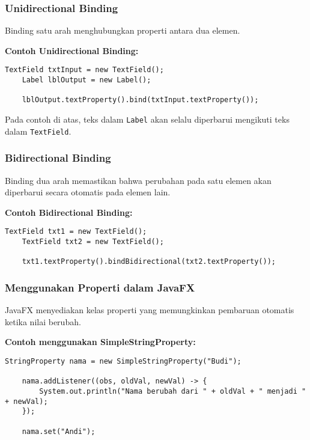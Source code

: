 \subsubsection{Unidirectional Binding}

Binding satu arah menghubungkan properti antara dua elemen.

\textbf{Contoh Unidirectional Binding:}
\begin{lstlisting}[style=JavaStyle, caption=Menghubungkan Label dengan TextField]
	TextField txtInput = new TextField();
	Label lblOutput = new Label();
	
	lblOutput.textProperty().bind(txtInput.textProperty());
\end{lstlisting}

Pada contoh di atas, teks dalam \texttt{Label} akan selalu diperbarui mengikuti teks dalam \texttt{TextField}.

\subsubsection{Bidirectional Binding}

Binding dua arah memastikan bahwa perubahan pada satu elemen akan diperbarui secara otomatis pada elemen lain.

\textbf{Contoh Bidirectional Binding:}
\begin{lstlisting}[style=JavaStyle, caption=Menghubungkan dua TextField secara bidirectional]
	TextField txt1 = new TextField();
	TextField txt2 = new TextField();
	
	txt1.textProperty().bindBidirectional(txt2.textProperty());
\end{lstlisting}

\subsubsection{Menggunakan Properti dalam JavaFX}

JavaFX menyediakan kelas properti yang memungkinkan pembaruan otomatis ketika nilai berubah.

\textbf{Contoh menggunakan SimpleStringProperty:}
\begin{lstlisting}[style=JavaStyle, caption=Penggunaan SimpleStringProperty]
	StringProperty nama = new SimpleStringProperty("Budi");
	
	nama.addListener((obs, oldVal, newVal) -> {
		System.out.println("Nama berubah dari " + oldVal + " menjadi " + newVal);
	});
	
	nama.set("Andi");
\end{lstlisting}

